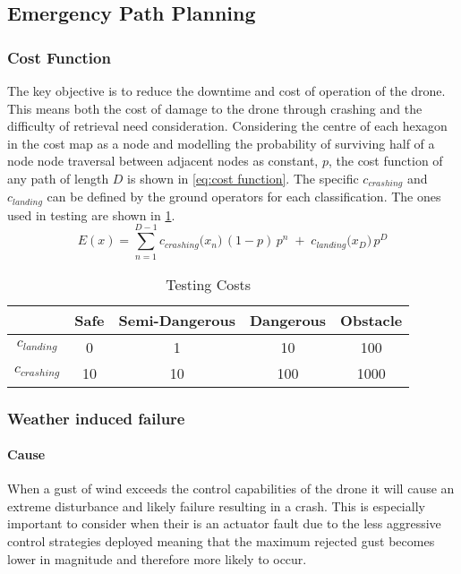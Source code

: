 \subsection{Emergency Path Planning}\label{sub_section:tgt_path_planning}

\subsubsection{Cost Function}\label{sub_sub_section:tgt_cost_function}
The key objective is to reduce the downtime and cost of operation of the drone. This means both the cost of damage to the drone through crashing and the difficulty of retrieval need consideration. Considering the centre of each hexagon in the cost map as a node and modelling the probability of surviving half of a node node traversal between adjacent nodes as constant, $p$, the cost function of any path of length $D$ is shown in \ref{eq:cost function}. The specific $c_{crashing}$ and $c_{landing}$ can be defined by the ground operators for each classification. The ones used in testing are shown in \ref{tab:cost_values}.
\begin{equation}\label{eq:cost function}
    E(x) 
    = \sum_{n=1}^{D-1} c_{crashing}\bigl(x_n\bigr)\, (1-p) \,p^n 
    \;+\; c_{landing}\bigl(x_D\bigr)\, p^D
\end{equation}
\begin{table}[h]
    \centering
    \begin{tabular}{|c|c|c|c|c|}
    \hline
         \textbf{} & \textbf{Safe} & \textbf{Semi-Dangerous} & \textbf{Dangerous} & \textbf{Obstacle} \\
         \hline
         \textbf{$c_{landing}$} & 0 & 1 & 10 & 100 \\
         \textbf{$c_{crashing}$} & 10 & 10 & 100 & 1000\\
         \hline
    \end{tabular}
    \caption{Testing Costs}
    \label{tab:cost_values}
\end{table}

\subsubsection{Weather induced failure}\label{sub_sub_section:tgt_weather_failure}
\paragraph{Cause}
When a gust of wind exceeds the control capabilities of the drone it will cause an extreme disturbance and likely failure resulting in a crash. This is especially important to consider when their is an actuator fault due to the less aggressive control strategies deployed meaning that the maximum rejected gust becomes lower in magnitude and therefore more likely to occur. 
